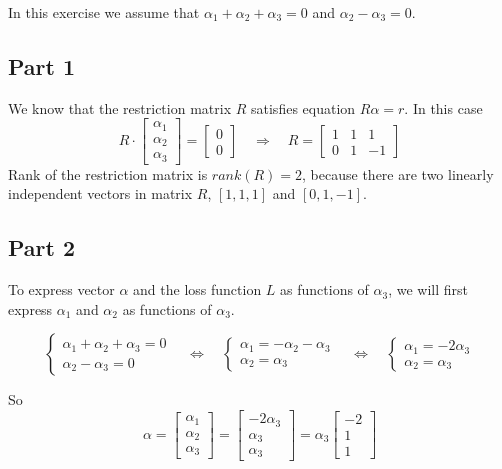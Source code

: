 \documentclass[12pt, a4paper]{article}\usepackage[]{graphicx}\usepackage[]{color}
\begin{document}
In this exercise we assume that $\alpha_1 + \alpha_2 + \alpha_3 = 0$ and $\alpha_2 - \alpha_3 = 0$. 

\subsection{Part 1}
We know that the restriction matrix $R$ satisfies equation $R \alpha = r$. In this case 
\[ 
  R \cdot
  \begin{bmatrix}  
      \alpha_1 \\ \alpha_2 \\ \alpha_3
  \end{bmatrix} 
  =
  \begin{bmatrix}  
    0 \\ 0
  \end{bmatrix} 
  \quad \Rightarrow \quad
  R = 
  \begin{bmatrix}  
    1 & 1 & 1 \\
    0 & 1 & -1
  \end{bmatrix}
\]
Rank of the restriction matrix is $rank(R) = 2$, because there are two linearly independent vectors in matrix $R$, $[1,1,1]$ and $[0,1,-1]$.


\subsection{Part 2}
To express vector $\alpha$ and the loss function $L$ as functions of $\alpha_3$, we will first express $\alpha_1$ and $\alpha_2$ as functions of $\alpha_3$.

\[ 
\begin{cases}
  \alpha_1 + \alpha_2 + \alpha_3 = 0 \\
  \alpha_2 - \alpha_3 = 0
\end{cases}
\quad \Leftrightarrow \quad
\begin{cases}
  \alpha_1 = - \alpha_2 - \alpha_3 \\
  \alpha_2 = \alpha_3
\end{cases}
\quad \Leftrightarrow \quad
\begin{cases}
  \alpha_1 = - 2 \alpha_3 \\
  \alpha_2 = \alpha_3
\end{cases}
\]

So 
\[
  \alpha = 
  \begin{bmatrix}  
      \alpha_1 \\ \alpha_2 \\ \alpha_3
  \end{bmatrix} 
  =
  \begin{bmatrix}  
      -2 \alpha_3 \\ \alpha_3 \\ \alpha_3
  \end{bmatrix} 
  =
  \alpha_3
  \begin{bmatrix}  
      -2 \\ 1 \\ 1
  \end{bmatrix} 
\]
\end{document}
